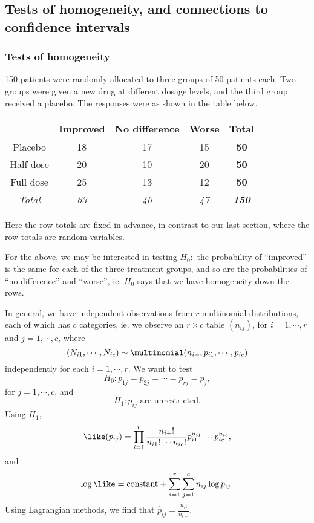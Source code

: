 \documentclass[a4paper]{article}
\begin{document}
\subsection{Tests of homogeneity, and connections to confidence intervals}
\subsubsection{Tests of homogeneity}
\begin{eg}
  150 patients were randomly allocated to three groups of 50 patients each. Two groups were given a new drug at different dosage levels, and the third group received a placebo. The responses were as shown in the table below.
  \begin{center}
    \begin{tabular}{ccccc}
      \toprule
      & Improved & No difference & Worse & \textbf{Total}\\\midrule
      Placebo & 18 & 17 & 15 & \textbf{50}\\
      Half dose & 20 & 10 & 20 & \textbf{50}\\
      Full dose & 25 & 13 & 12& \textbf{50}\\\midrule
      \textit{Total} & \textit{63} & \textit{40} & \textit{47} & \textbf{\textit{150}}\\\bottomrule
    \end{tabular}
  \end{center}
  Here the row totals are fixed in advance, in contrast to our last section, where the row totals are random variables.

  For the above, we may be interested in testing $H_0:$ the probability of ``improved'' is the same for each of the three treatment groups, and so are the probabilities of ``no difference'' and ``worse'', ie. $H_0$ says that we have homogeneity down the rows.
\end{eg}
In general, we have independent observations from $r$ multinomial distributions, each of which has $c$ categories, ie. we observe an $r\times c$ table $(n_{ij})$, for $i = 1, \cdots, r$ and $j = 1, \cdots, c$, where
\[
  (N_{i1}, \cdots, N_{ic}) \sim \multinomial(n_{i+}, p_{i1}, \cdots, p_{ic})
\]
independently for each $i = 1, \cdots, r$.
We want to test
\[
  H_0: p_{1j} = p_{2j} = \cdots = p_{rj} = p_j,
\]
for $j = 1, \cdots, c$, and
\[
  H_1: p_{ij}\text{ are unrestricted}.
\]
Using $H_1$,
\[
  \like(p_{ij}) = \prod_{i = 1}^r \frac{n_{i+}!}{n_{i1}!\cdots n_{ic}!}p_{i1}^{n_{i1}} \cdots p_{ic}^{n_{ic}},
\]
and
\[
  \log\like = \text{constant} + \sum_{i = 1}^r \sum_{j = 1}^c n_{ij}\log p_{ij}.
\]
Using Lagrangian methods, we find that $\hat{p}_{ij} = \frac{n_{ij}}{n_{i+}}$.
\end{document}
